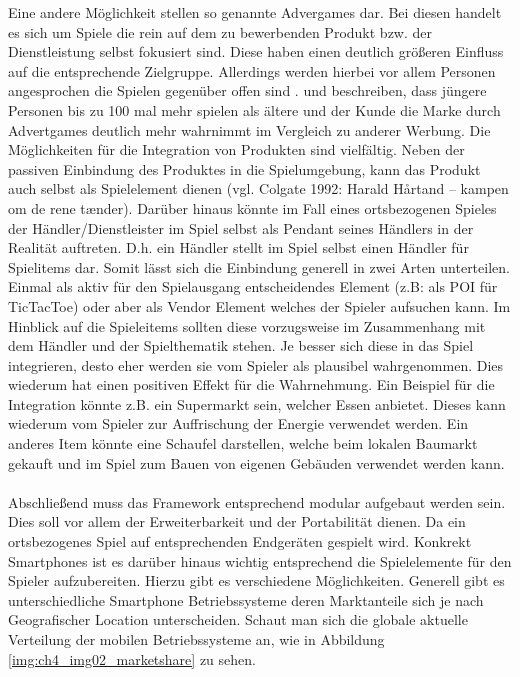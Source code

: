 Eine andere Möglichkeit stellen so genannte Advergames dar. Bei diesen handelt es sich um Spiele die rein auf dem zu bewerbenden Produkt bzw. der Dienstleistung selbst fokusiert sind. Diese haben einen deutlich größeren Einfluss auf die entsprechende Zielgruppe. Allerdings werden hierbei vor allem Personen angesprochen die Spielen gegenüber offen sind \cite{Winkler.2006}. \textcite{Chen.2001} und \textcite{Dahl.2009} beschreiben, dass jüngere Personen bis zu 100 mal mehr spielen als ältere und der Kunde die Marke durch Advertgames deutlich mehr wahrnimmt im Vergleich zu anderer Werbung.
Die Möglichkeiten für die Integration von Produkten sind vielfältig. Neben der passiven Einbindung des Produktes in die Spielumgebung, kann das Produkt auch selbst als Spielelement dienen (vgl. Colgate 1992: Harald Hårtand -- kampen om de rene tænder).
Darüber hinaus könnte im Fall eines ortsbezogenen Spieles der Händler/Dienstleister im Spiel selbst als Pendant seines Händlers in der Realität auftreten. D.h. ein Händler stellt im Spiel selbst einen Händler für Spielitems dar.
Somit lässt sich die Einbindung generell in zwei Arten unterteilen. Einmal als aktiv für den Spielausgang entscheidendes Element (z.B: als POI für TicTacToe) oder aber als Vendor Element welches der Spieler aufsuchen kann.
Im Hinblick auf die Spieleitems sollten diese vorzugsweise im Zusammenhang mit dem Händler und der Spielthematik stehen. Je besser sich diese in das Spiel integrieren, desto eher werden sie vom Spieler als plausibel wahrgenommen. Dies wiederum hat einen positiven Effekt für die Wahrnehmung.
Ein Beispiel für die Integration könnte z.B. ein Supermarkt sein, welcher Essen anbietet. Dieses kann wiederum vom Spieler zur Auffrischung der Energie verwendet werden. Ein anderes Item könnte eine Schaufel darstellen, welche beim lokalen Baumarkt gekauft und im Spiel zum Bauen von eigenen Gebäuden verwendet werden kann.
\\\\
Abschließend muss das Framework entsprechend modular aufgebaut werden sein. Dies soll vor allem der Erweiterbarkeit und der Portabilität dienen. Da ein ortsbezogenes Spiel auf entsprechenden Endgeräten gespielt wird. Konkrekt Smartphones ist es darüber hinaus wichtig entsprechend die Spielelemente für den Spieler aufzubereiten. Hierzu gibt es verschiedene Möglichkeiten.
Generell gibt es unterschiedliche Smartphone Betriebssysteme deren Marktanteile sich je nach Geografischer Location unterscheiden.
Schaut man sich die globale aktuelle Verteilung der mobilen Betriebssysteme an, wie in Abbildung \ref{img:ch4_img02_marketshare} zu sehen.

